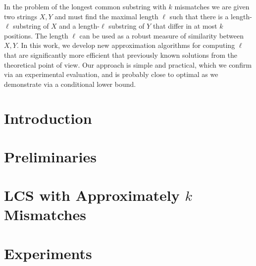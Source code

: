 
\newcommand{\inputLCS}[1]{}
\newcommand{\figLCS}[2]{\texttt{[image: Part\_Two/lcs/\#2]}}

\newcommand{\lcpe}{\mathrm{LCP}_{(1+\eps)k}}
\newcommand{\lcp}{\mathrm{LCP}_{\tilde{k}}}
\newcommand{\lcpk}{\mathrm{LCP}_{k}}
\newcommand{\lcske}{\mathrm{LCS}_{(1+\eps)k}}
\newcommand{\lcsak}{\mathrm{LCS}_{\tilde{k}}}
\newcommand{\sk}{\mathrm{sk}}
\newcommand{\Prob}{\mathrm{Pr}}
\newcommand{\LCSp}{\textsf{LCS}\xspace}
\newcommand{\Bichromatic}{\textsf{$(1+\gamma)$-approximate Bichromatic Closest Pair}\xspace}
\newcommand{\NN}{\textsf{Approximate Near Neighbour}\xspace}
\newcommand{\twentyquestions}{\textsf{Twenty Questions}\xspace}
\newcommand{\Carole}{\mathit{Carole}}
\newcommand{\pop}{\mathit{pop}}
\newcommand{\push}{\mathit{push}}
\newcommand{\ttop}{\mathit{top}}
\newcommand{\mmid}{\mathit{mid}}

\newcommand{\Hashes}{\mathcal{H}}
\newcommand{\Collisions}{C}
\newcommand{\Bad}{B}
\newcommand{\Projections}{\Pi}
\newcommand{\Pos}{\mathsf{P}}
\newcommand{\HD}{d_H}

\providecommand{\LCP}{\mathrm{LCP}}
\providecommand{\ceil}[1]{\ensuremath{\lceil#1\rceil}}
\providecommand{\eps}{\varepsilon}

\newcommand{\norm}[1]{\ensuremath{\lVert#1\rVert}}

\newcommand\restr[2]{{
  \left.\kern-\nulldelimiterspace
  #1 
  \vphantom{\big|}
  \right|_{#2} 
}}

\begin{small}
    In the problem of the longest common substring with $k$ mismatches we are given two strings $X, Y$ and must find the maximal length $\ell$ such that there is a length-$\ell$ substring of $X$ and a length-$\ell$ substring of $Y$ that differ in at most $k$ positions. The length $\ell$ can be used as a robust measure of similarity between $X, Y$. In this work, we develop new approximation algorithms for computing $\ell$ that are significantly more efficient that previously known solutions from the theoretical point of view. Our approach is simple and practical, which we confirm via an experimental evaluation, and is probably close to optimal as we demonstrate via a conditional lower bound.
\end{small}


\section{Introduction}\label{lcs:sec:intro}
\inputLCS{intro}
	
\section{Preliminaries}\label{lcs:sec:prelim}
\inputLCS{prelim}

\section{LCS with Approximately \texorpdfstring{$k$}{k} Mismatches}\label{lcs:sec:klcs}
\inputLCS{klcs}


\section{Experiments}\label{lcs:sec:implem}
\inputLCS{implem}
